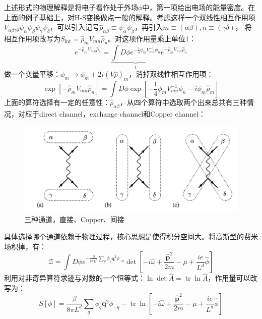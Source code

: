 \documentclass[10pt,openany]{book}
\theoremstyle{thmstyle} %
\theoremstyle{defstyle} %
\theoremstyle{prostyle} %
\begin{document}
上述形式的物理解释是将电子看作处于外场$ \phi $中，第一项给出电场的能量密度。在上面的例子基础上，对H-S变换做点一般的解释。考虑这样一个双线性相互作用项$ V_{\alpha \beta \gamma \delta} \bar{\psi}_\alpha \psi_\beta \bar{\psi}_\gamma \psi_\delta $，可以引入记号$ \hat{\rho}_{\alpha \beta} \equiv \psi_\alpha \psi_\beta $，再引入$ m \equiv(\alpha \beta), n \equiv(\gamma \delta) $， 将相互作用项改写为$ S_{\mathrm{int}}=\hat{\rho}_m V_{m n} \hat{\rho}_n $。对这项作用量乘上单位1：
\begin{equation}
  e^{-\hat{\rho}_m V_{m n} \hat{\rho}_n}=\underbrace{\int D \phi e^{-\frac{1}{4} \phi_m V_{m n}^{-1} \phi_n}}_1 e^{-\hat{\rho}_m V_{m n} \hat{\rho}_n}
\end{equation}   
做一个变量平移：$ \phi_m \rightarrow \phi_m+2 i(V \hat{\rho})_m $，消掉双线性相互作用项：
\begin{equation}
  \exp \left[-\hat{\rho}_m V_{m n} \hat{\rho}_n\right]=\int D \phi \exp \left[-\frac{1}{4} \phi_m V_{m n}^{-1} \phi_n-i \phi_m \hat{\rho}_m\right]
\end{equation} 
上面的算符选择有一定的任意性：$ \hat{\rho}_{\alpha \beta} $，从四个算符中选取两个出来总共有三种情况，对应于direct channel，exchange channel和Copper channel：
\begin{figure}[htbp]
  \centering
  \includegraphics*[scale=0.7]{channels.png}
  \caption{三种通道，直接、Copper、间接}
\end{figure} 
具体选择哪个通道依赖于物理过程，核心思想是使得积分空间大。将高斯型的费米场积掉，有：
\begin{equation}
  \mathcal{Z}=\int D \phi e^{-\frac{\beta}{8 \pi L^3} \sum_q \phi_q \mathbf{q}^2 \phi_{-q}} \operatorname{det}\left[-i \hat{\omega}+\frac{\hat{\mathbf{p}}^2}{2 m}-\mu+\frac{i e}{L^d} \hat{\phi}\right]
\end{equation}
利用对非奇异算符求迹与对数的一个恒等式：$ \ln \operatorname{det} \hat{A}=\operatorname{tr} \ln \hat{A} $，作用量可以改写为：
\begin{equation}
  S[\phi]=\frac{\beta}{8 \pi L^d} \sum_q \phi_q \mathbf{q}^2 \phi_{-q}-\operatorname{tr} \ln \left[-i \hat{\omega}+\frac{\hat{\mathbf{p}}^2}{2 m}-\mu+\frac{i e}{L^d} \hat{\phi}\right]
\end{equation}
\end{document}
